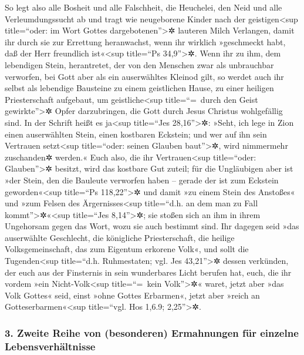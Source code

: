 So legt also alle Bosheit und alle Falschheit, die
Heuchelei, den Neid und alle Verleumdungssucht ab  und
tragt wie neugeborene Kinder nach der geistigen\textless sup
title=``oder: im Wort Gottes dargebotenen''\textgreater✲ lauteren Milch
Verlangen, damit ihr durch sie zur Errettung heranwachst, 
wenn ihr wirklich »geschmeckt habt, daß der Herr freundlich
ist«\textless sup title=``Ps 34,9''\textgreater✲.  Wenn
ihr zu ihm, dem lebendigen Stein, herantretet, der von den Menschen zwar
als unbrauchbar verworfen, bei Gott aber als ein auserwähltes Kleinod
gilt,  so werdet auch ihr selbst als lebendige Bausteine
zu einem geistlichen Hause, zu einer heiligen Priesterschaft aufgebaut,
um geistliche\textless sup title=``=~durch den Geist
gewirkte''\textgreater✲ Opfer darzubringen, die Gott durch Jesus
Christus wohlgefällig sind.  In der Schrift heißt es
ja\textless sup title=``Jes 28,16''\textgreater✲: »Seht, ich lege in
Zion einen auserwählten Stein, einen kostbaren Eckstein; und wer auf ihn
sein Vertrauen setzt\textless sup title=``oder: seinen Glauben
baut''\textgreater✲, wird nimmermehr zuschanden✲ werden.« 
Euch also, die ihr Vertrauen\textless sup title=``oder:
Glauben''\textgreater✲ besitzt, wird das kostbare Gut zuteil; für die
Ungläubigen aber ist »der Stein, den die Bauleute verworfen haben --
gerade der ist zum Eckstein geworden«\textless sup title=``Ps
118,22''\textgreater✲  und damit »zu einem Stein des
Anstoßes« und »zum Felsen des Ärgernisses\textless sup title=``d.h. an
dem man zu Fall kommt''\textgreater✲«\textless sup title=``Jes
8,14''\textgreater✲; sie stoßen sich an ihm in ihrem Ungehorsam gegen
das Wort, wozu sie auch bestimmt sind.  Ihr dagegen seid
»das auserwählte Geschlecht, die königliche Priesterschaft, die heilige
Volksgemeinschaft, das zum Eigentum erkorene Volk«, und sollt die
Tugenden\textless sup title=``d.h. Ruhmestaten; vgl. Jes
43,21''\textgreater✲ dessen verkünden, der euch aus der Finsternis in
sein wunderbares Licht berufen hat,  euch, die ihr vordem
»ein Nicht-Volk\textless sup title=``=~kein Volk''\textgreater✲« waret,
jetzt aber »das Volk Gottes« seid, einst »ohne Gottes Erbarmen«, jetzt
aber »reich an Gotteserbarmen«\textless sup title=``vgl. Hos 1,6.9;
2,25''\textgreater✲.

\hypertarget{zweite-reihe-von-besonderen-ermahnungen-fuxfcr-einzelne-lebensverhuxe4ltnisse}{%
\subsubsection{3. Zweite Reihe von (besonderen) Ermahnungen für einzelne
Lebensverhältnisse}\label{zweite-reihe-von-besonderen-ermahnungen-fuxfcr-einzelne-lebensverhuxe4ltnisse}}

